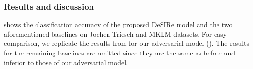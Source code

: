\subsubsection{Results and discussion}

 shows the classification accuracy of the proposed DeSIRe model and the two aforementioned baselines on Jochen-Triesch and MKLM datasets. For easy comparison, we replicate the results from  for our adversarial model (). The results for the remaining baselines are omitted since they are the same as before and inferior to those of our adversarial model.

\begin{table}[t]
    \centering
    \caption{Classification accuracy (\%) of DeSIRe and baselines on Jochen-Triesch and MKLM datasets.}
    \label{tab:desire_jt_mklm_results}
\end{table}

